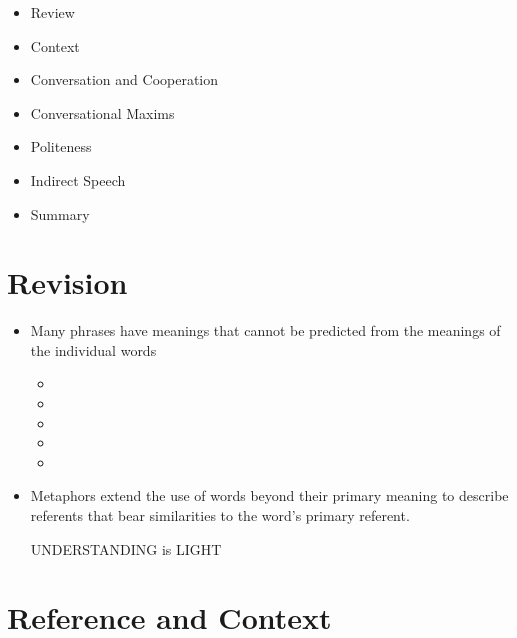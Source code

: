 \documentclass[a4paper,landscape,headrule,footrule,xetex]{foils}
\begin{document}
\maketitle

%



\begin{itemize}
\item Review
\item Context
\item Conversation and Cooperation
\item Conversational Maxims
\item Politeness
\item Indirect Speech
\item Summary

\end{itemize}

\section{Revision}

\begin{itemize}
\item Many phrases have meanings that cannot be predicted from the meanings of the individual words
  \begin{itemize}
  \item {}
  \item {}
  \item {}
  \item {}
  \item {}
  \end{itemize}
\item Metaphors extend the use of words beyond their primary meaning
  to describe referents that bear similarities to the word's primary
  referent.
\begin{exe}
  \ex {}
\end{exe}
UNDERSTANDING is LIGHT
\end{itemize}


\section{Reference and Context}
\MyLogo{}
\end{document}
